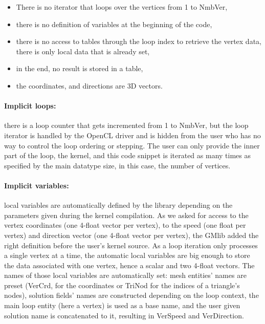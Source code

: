 \documentclass[a4paper,12pt]{article}
\begin{document}
\begin{itemize}
\item There is no iterator that loops over the vertices from 1 to NmbVer,
\item there is no definition of variables at the beginning of the code,
\item there is no access to tables through the loop index to retrieve the vertex data, there is only local data that is already set,
\item in the end, no result is stored in a table,
\item the coordinates, and directions are 3D vectors.
\end{itemize}

\paragraph{Implicit loops:} there is a loop counter that gets incremented from 1 to NmbVer, but the loop iterator is handled by the OpenCL driver and is hidden from the user who has no way to control the loop ordering or stepping. The user can only provide the inner part of the loop, the kernel, and this code snippet is iterated as many times as specified by the main datatype size, in this case, the number of vertices.

\paragraph{Implicit variables:} local variables are automatically defined by the library depending on the parameters given during the kernel compilation. As we asked for access to the vertex coordinates (one 4-float vector per vertex), to the speed (one float per vertex) and direction vector (one 4-float vector per vertex), the GMlib added the right definition before the user's kernel source. As a loop iteration only processes a single vertex at a time, the automatic local variables are big enough to store the data associated with one vertex, hence a scalar and two 4-float vectors. The names of those local variables are automatically set: mesh entities' names are preset (VerCrd, for the coordinates or TriNod for the indices of a triangle's nodes), solution fields' names are constructed depending on the loop context, the main loop entity (here a vertex) is used as a base name, and the user given solution name is concatenated to it, resulting in VerSpeed and VerDirection. 
\end{document}
